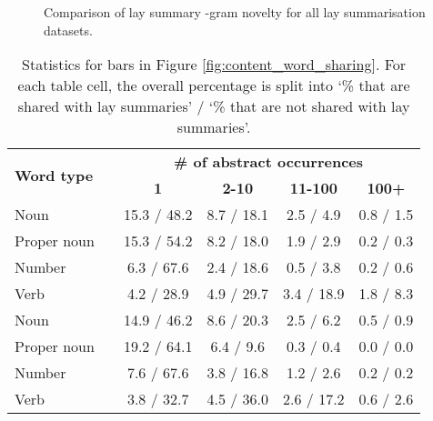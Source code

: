 \documentclass[11pt]{article}
\begin{document}
\begin{figure*}[ht]
    \centering
    \caption{Comparison of lay summary -gram novelty for all lay summarisation datasets.}
    \label{fig:ds_novelty_comp}
\end{figure*}




\begin{table*}[t]
    \centering
    \begin{tabular}{llcccc} \hline
        \multirow{2}{*}{\textbf{Word type}} && \multicolumn{4}{c}{\textbf{\# of abstract occurrences}}  \\ 
        \cline{3-6} && \textbf{1} & \textbf{2-10} & \textbf{11-100} & \textbf{100+} \\ 
        \hline
        \parbox[t]{1mm}{\footnotesize {}}
        \hspace{3pt} Noun        && 15.3 / 48.2 & 8.7 / 18.1 & 2.5 / 4.9  & 0.8 / 1.5 \\
        \hspace{8pt} Proper noun && 15.3 / 54.2 & 8.2 / 18.0 & 1.9 / 2.9  & 0.2 / 0.3 \\   
        \hspace{8pt} Number      && 6.3  / 67.6 & 2.4 / 18.6 & 0.5 / 3.8  & 0.2 / 0.6 \\ 
        \hspace{8pt} Verb        && 4.2 / 28.9  & 4.9 / 29.7 & 3.4 / 18.9 & 1.8 / 8.3 \\
        \hline
        \parbox[t]{1mm}{\footnotesize {}}
        \hspace{3pt} Noun        && 14.9 / 46.2 & 8.6 / 20.3 & 2.5 / 6.2 & 0.5 / 0.9 \\
        \hspace{8pt} Proper noun && 19.2 / 64.1 & 6.4 / 9.6  & 0.3 / 0.4 & 0.0 / 0.0 \\
        \hspace{8pt} Number      && 7.6  / 67.6 & 3.8 / 16.8 & 1.2 / 2.6 & 0.2 / 0.2 \\ 
        \hspace{8pt} Verb        && 3.8  / 32.7 & 4.5 / 36.0 & 2.6 / 17.2 & 0.6 / 2.6  \\
        \hline
\end{tabular}
    \caption{Statistics for bars in Figure \ref{fig:content_word_sharing}. For each table cell, the overall percentage is split into `\% that are shared with lay summaries' / `\% that are not shared with lay summaries'.}
    \label{tab:rare_words_type}
\end{table*}
\end{document}
